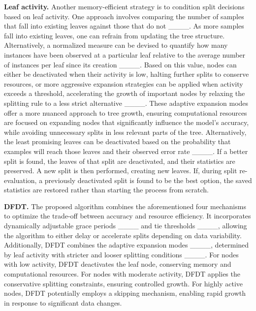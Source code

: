 \textbf{Leaf activity.} Another memory-efficient strategy is to condition split decisions based on leaf activity. One approach involves comparing the number of samples that fall into existing leaves against those that do not ____. As more samples fall into existing leaves, one can refrain from updating the tree structure. Alternatively, a normalized measure can be devised to quantify how many instances have been observed at a particular leaf relative to the average number of instances per leaf since its creation ____. Based on this value, nodes can either be deactivated when their activity is low, halting further splits to conserve resources, or more aggressive expansion strategies can be applied when activity exceeds a threshold, accelerating the growth of important nodes by relaxing the splitting rule to a less strict alternative ____. These adaptive expansion modes offer a more nuanced approach to tree growth, ensuring computational resources are focused on expanding nodes that significantly influence the model’s accuracy, while avoiding unnecessary splits in less relevant parts of the tree. Alternatively, the least promising leaves can be deactivated based on the probability that examples will reach those leaves and their observed error rate ____. If a better split is found, the leaves of that split are deactivated, and their statistics are preserved. A new split is then performed, creating new leaves. If, during split re-evaluation, a previously deactivated split is found to be the best option, the saved statistics are restored rather than starting the process from scratch.

\textbf{DFDT.} The proposed algorithm combines the aforementioned four mechanisms to optimize the trade-off between accuracy and resource efficiency. It incorporates dynamically adjustable grace periods ____ and tie thresholds ____, allowing the algorithm to either delay or accelerate splits depending on data variability. Additionally, DFDT combines the adaptive expansion modes ____, determined by leaf activity with stricter and looser splitting conditions ____. For nodes with low activity, DFDT deactivates the leaf node, conserving memory and computational resources. For nodes with moderate activity, DFDT applies the conservative splitting constraints, ensuring controlled growth. For highly active nodes, DFDT potentially employs a skipping mechanism, enabling rapid growth in response to significant data changes.